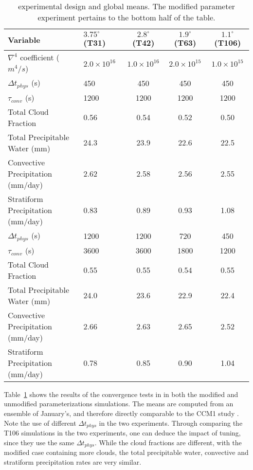  \begin{table}
 \caption{\cite{WETAL1995CD} experimental design and global means. The modified parameter experiment pertains to the bottom half of the table.}
 \centering
 \scriptsize
 \begin{tabular}{llccc}
 \hline
 Variable & $3.75^{\circ}$ (T31) & $2.8^{\circ}$ (T42) & $1.9^{\circ}$ (T63)  & $1.1^{\circ}$ (T106) \\
 \hline
   $\nabla^{4}$ coefficient ($m^4/s$) & $2.0 \times 10^{16}$ & $1.0 \times 10^{16}$ & $2.0 \times 10^{15}$ & $1.0 \times 10^{15}$ \\
   $\Delta t_{phys}$ (s) & 450 & 450 & 450 & 450 \\
   $\tau_{conv}$ (s) & 1200 & 1200 & 1200 & 1200 \\   
   Total Cloud Fraction & 0.56 & 0.54 & 0.52 & 0.50 \\
   Total Precipitable Water (mm) & 24.3 & 23.9 & 22.6 & 22.5 \\
   Convective Precipitation (mm/day) & 2.62 & 2.58 & 2.56 & 2.55 \\
   Stratiform Precipitation (mm/day) & 0.83 & 0.89 & 0.93 & 1.08 \\  
   \hline
   $\Delta t_{phys}$ (s) & 1200 & 1200 & 720 & 450 \\
   $\tau_{conv}$ (s) & 3600 & 3600 & 1800 & 1200 \\
   Total Cloud Fraction & 0.55 & 0.55 & 0.54 & 0.55 \\
   Total Precipitable Water (mm) & 24.0 & 23.6 & 22.9 & 22.4 \\
   Convective Precipitation (mm/day) & 2.66 & 2.63 & 2.65 & 2.52 \\
   Stratiform Precipitation (mm/day) & 0.78 & 0.85 & 0.90 & 1.04 \\    
 \hline
 \end{tabular}
 \label{tbl:table1-2}
 \end{table}

Table~\ref{tbl:table1-2} shows the results of the convergence tests in \cite{WETAL1995CD} in both the modified and unmodified parameterizations simulations. The means are computed from an ensemble of January's, and therefore directly comparable to the CCM1 study \citep{KW1991JGR}. Note the use of different $\Delta t_{phys}$ in the two experiments. Through comparing the T106 simulations in the two experiments, one can deduce the impact of tuning, since they use the same $\Delta t_{phys}$. While the cloud fractions are different, with the modified case containing more clouds, the total precipitable water, convective and stratiform precipitation rates are very similar. 

